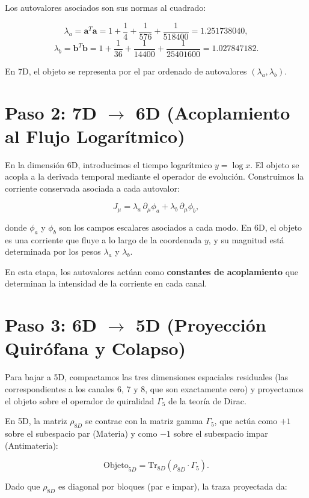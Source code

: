 \documentclass[12pt,a4paper]{article}
\begin{document}
Los autovalores asociados son sus normas al cuadrado:

\[
\lambda_a = \mathbf{a}^T\mathbf{a} = 1 + \frac{1}{4} + \frac{1}{576} + \frac{1}{518400} = 1.251738040,
\]
\[
\lambda_b = \mathbf{b}^T\mathbf{b} = 1 + \frac{1}{36} + \frac{1}{14400} + \frac{1}{25401600} = 1.027847182.
\]

En 7D, el objeto se representa por el par ordenado de autovalores \((\lambda_a, \lambda_b)\).

\section{Paso 2: 7D $\to$ 6D (Acoplamiento al Flujo Logarítmico)}

En la dimensión 6D, introducimos el tiempo logarítmico \(y = \log x\). El objeto se acopla a la derivada temporal mediante el operador de evolución. Construimos la corriente conservada asociada a cada autovalor:

\[
J_\mu = \lambda_a \, \partial_\mu \phi_a + \lambda_b \, \partial_\mu \phi_b,
\]

donde \(\phi_a\) y \(\phi_b\) son los campos escalares asociados a cada modo. En 6D, el objeto es una corriente que fluye a lo largo de la coordenada \(y\), y su magnitud está determinada por los pesos \(\lambda_a\) y \(\lambda_b\).

En esta etapa, los autovalores actúan como \textbf{constantes de acoplamiento} que determinan la intensidad de la corriente en cada canal.

\section{Paso 3: 6D $\to$ 5D (Proyección Quirófana y Colapso)}

Para bajar a 5D, compactamos las tres dimensiones espaciales residuales (las correspondientes a los canales 6, 7 y 8, que son exactamente cero) y proyectamos el objeto sobre el operador de quiralidad \(\Gamma_5\) de la teoría de Dirac.

En 5D, la matriz \(\rho_{8D}\) se contrae con la matriz gamma \(\Gamma_5\), que actúa como \(+1\) sobre el subespacio par (Materia) y como \(-1\) sobre el subespacio impar (Antimateria):

\[
\text{Objeto}_{5D} = \text{Tr}_{8D} \left( \rho_{8D} \cdot \Gamma_5 \right).
\]

Dado que \(\rho_{8D}\) es diagonal por bloques (par e impar), la traza proyectada da:
\end{document}
